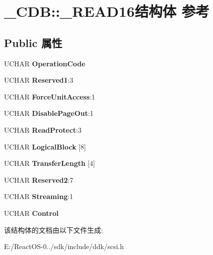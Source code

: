 \hypertarget{struct___c_d_b_1_1___r_e_a_d16}{}\section{\+\_\+\+C\+DB\+:\+:\+\_\+\+R\+E\+A\+D16结构体 参考}
\label{struct___c_d_b_1_1___r_e_a_d16}
\subsection*{Public 属性}
\begin{DoxyCompactItemize}
\item 
\mbox{\label{struct___c_d_b_1_1___r_e_a_d16_a9098b6dd379e61004ef77b9c2e5ae9b8}} 
U\+C\+H\+AR {\bfseries Operation\+Code}
\item 
\mbox{\label{struct___c_d_b_1_1___r_e_a_d16_a50d2417fd64b8cc1d179cb487ae6c4bf}} 
U\+C\+H\+AR {\bfseries Reserved1}\+:3
\item 
\mbox{\label{struct___c_d_b_1_1___r_e_a_d16_ab3c60a190b2ee5609d793f52b8293e6c}} 
U\+C\+H\+AR {\bfseries Force\+Unit\+Access}\+:1
\item 
\mbox{\label{struct___c_d_b_1_1___r_e_a_d16_ae6e00fa381f9ad13f481719a3acbf9bd}} 
U\+C\+H\+AR {\bfseries Disable\+Page\+Out}\+:1
\item 
\mbox{\label{struct___c_d_b_1_1___r_e_a_d16_a7f20d5378d3c9a6fddc2f2905453703b}} 
U\+C\+H\+AR {\bfseries Read\+Protect}\+:3
\item 
\mbox{\label{struct___c_d_b_1_1___r_e_a_d16_a12b95eba291aec0c149afbd11f659f20}} 
U\+C\+H\+AR {\bfseries Logical\+Block} \mbox{[}8\mbox{]}
\item 
\mbox{\label{struct___c_d_b_1_1___r_e_a_d16_adab97b3746f2117130186f0ccdb1eee4}} 
U\+C\+H\+AR {\bfseries Transfer\+Length} \mbox{[}4\mbox{]}
\item 
\mbox{\label{struct___c_d_b_1_1___r_e_a_d16_a78e98e00413f939f3c6bb61eecb7b9ea}} 
U\+C\+H\+AR {\bfseries Reserved2}\+:7
\item 
\mbox{\label{struct___c_d_b_1_1___r_e_a_d16_ad98d6e7e2dc211b4d4f9abbcba54106e}} 
U\+C\+H\+AR {\bfseries Streaming}\+:1
\item 
\mbox{\label{struct___c_d_b_1_1___r_e_a_d16_ace0116fbeacc60bbaf7986296c6ed1fb}} 
U\+C\+H\+AR {\bfseries Control}
\end{DoxyCompactItemize}


该结构体的文档由以下文件生成\+:\begin{DoxyCompactItemize}
\item 
E\+:/\+React\+O\+S-\/0../sdk/include/ddk/scsi.\+h\end{DoxyCompactItemize}
